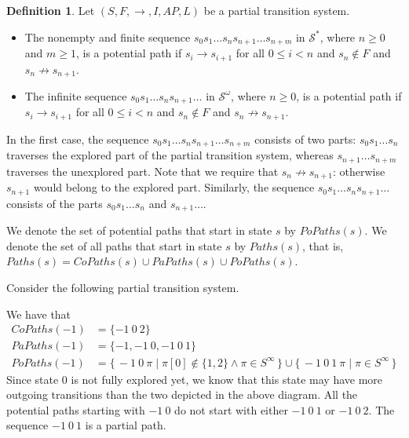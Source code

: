 \documentclass[12pt]{article}
\theoremstyle{definition}
\newtheorem{definition}{Definition}
\newenvironment{franck}{\color{red}}{\color{black}}
\begin{document}
\begin{definition}
Let $(S, F, \rightarrow, I, \mathit{AP}, L)$ be a partial transition system.
\begin{itemize}
\item 
The nonempty and finite sequence $s_0 s_1 \ldots s_n s_{n+1} \ldots s_{n+m}$ in $\mathcal{S}^*$, where $n \geq 0$ and $m \geq 1$, is a potential path if $s_i \rightarrow s_{i+1}$ for all $0 \leq i < n$ and $s_n \not\in F$ and $s_n \not\rightarrow s_{n+1}$.
\item 
The infinite sequence $s_0 s_1 \ldots s_n s_{n+1} \ldots$ in $\mathcal{S}^{\omega}$, where $n \geq 0$, is a potential path if $s_i \rightarrow s_{i+1}$ for all $0 \leq i < n$ and $s_n \not\in F$ and $s_n \not\rightarrow s_{n+1}$.
\end{itemize}
\end{definition}

In the first case, the sequence $s_0 s_1 \ldots s_n s_{n+1} \ldots s_{n+m}$ consists of two parts: $s_0 s_1 \ldots s_n$ traverses the explored part of the partial transition system, whereas $s_{n+1} \ldots s_{n+m}$ traverses the unexplored part.  Note that we require that $s_n \not\rightarrow s_{n+1}$: otherwise $s_{n+1}$ would belong to the explored part.  Similarly, the sequence $s_0 s_1 \ldots s_n s_{n+1} \ldots$ consists of the parts $s_0 s_1 \ldots s_n$ and $s_{n+1} \ldots$.  

\begin{franck}
We denote the set of potential paths that start in state $s$ by $\mathit{PoPaths}(s)$.  We denote the set of all paths that start in state $s$ by $\mathit{Paths}(s)$, that is, $\mathit{Paths}(s) = \mathit{CoPaths}(s) \cup \mathit{PaPaths}(s) \cup \mathit{PoPaths}(s)$.
\end{franck}

Consider the following partial transition system.
\begin{center}
\end{center}
We have that
\begin{align*}
\mathit{CoPaths}(-1) & = \{ -1\ 0\ 2 \}\\
\mathit{PaPaths}(-1) & = \{ -1, -1\ 0, -1\ 0\ 1 \}\\
\mathit{PoPaths}(-1) & = \{\, -1\ 0\ \pi \mid \pi[0] \not\in \{ 1, 2 \} \wedge \pi \in S^{\infty} \,\} \cup \{\, -1\ 0\ 1\ \pi \mid \pi \in S^{\infty} \,\}
\end{align*}
Since state 0 is not fully explored yet, we know that this state may have more outgoing transitions than the two depicted in the above diagram.  All the potential paths starting with $-1\ 0$ do not start with either $-1\ 0\ 1$ or $-1\ 0\ 2$.  The sequence $-1\ 0\ 1$ is a partial path.
\end{document}
